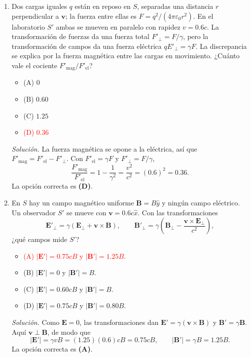 \documentclass[11pt]{article}
\begin{document}
\begin{enumerate}
    \item Dos cargas iguales $q$ están en reposo en $S$, separadas una distancia $r$ perpendicular a $\mathbf{v}$; la fuerza entre ellas es $F=q^2/(4\pi\varepsilon_0r^2)$. En el laboratorio $S'$ ambas se mueven en paralelo con rapidez $v=0.6c$. La transformación de fuerzas da una fuerza total $F'_{\perp}=F/\gamma$, pero la transformación de campos da una fuerza eléctrica $qE'_{\perp}=\gamma F$. La discrepancia se explica por la fuerza magnética entre las cargas en movimiento. ¿Cuánto vale el cociente $F'_{\mathrm{mag}}/F'_{\mathrm{el}}$?
    \begin{itemize}
        \item (A) $0$
        \item (B) $0.60$
        \item (C) $1.25$
        \item \textcolor{red}{(D) $0.36$}
    \end{itemize}
    \textit{Solución.} La fuerza magnética se opone a la eléctrica, así que $F'_{\mathrm{mag}}=F'_{\mathrm{el}}-F'_{\perp}$. Con $F'_{\mathrm{el}}=\gamma F$ y $F'_{\perp}=F/\gamma$,
    \[
        \frac{F'_{\mathrm{mag}}}{F'_{\mathrm{el}}}
        =1-\frac{1}{\gamma^2}=\frac{v^2}{c^2}=(0.6)^2=0.36.
    \]
    La opción correcta es \textbf{(D)}. \parencite{chaparro2026}

    \item En $S$ hay un campo magnético uniforme $\mathbf{B}=B\hat{y}$ y ningún campo eléctrico. Un observador $S'$ se mueve con $\mathbf{v}=0.6c\hat{x}$. Con las transformaciones
    \[
        \mathbf{E}'_{\perp}=\gamma(\mathbf{E}_{\perp}+\mathbf{v}\times\mathbf{B}),
        \qquad
        \mathbf{B}'_{\perp}=\gamma\left(\mathbf{B}_{\perp}-\frac{\mathbf{v}\times\mathbf{E}_{\perp}}{c^2}\right),
    \]
    ¿qué campos mide $S'$?
    \begin{itemize}
        \item \textcolor{red}{(A) $|\mathbf{E}'|=0.75cB$ y $|\mathbf{B}'|=1.25B$.}
        \item (B) $|\mathbf{E}'|=0$ y $|\mathbf{B}'|=B$.
        \item (C) $|\mathbf{E}'|=0.60cB$ y $|\mathbf{B}'|=B$.
        \item (D) $|\mathbf{E}'|=0.75cB$ y $|\mathbf{B}'|=0.80B$.
    \end{itemize}
    \textit{Solución.} Como $\mathbf{E}=0$, las transformaciones dan $\mathbf{E}'=\gamma(\mathbf{v}\times\mathbf{B})$ y $\mathbf{B}'=\gamma\mathbf{B}$. Aquí $\mathbf{v}\perp\mathbf{B}$, de modo que
    \[
        |\mathbf{E}'|=\gamma vB=(1.25)(0.6)cB=0.75cB,
        \qquad |\mathbf{B}'|=\gamma B=1.25B.
    \]
    La opción correcta es \textbf{(A)}. \parencite{chaparro2026}
\end{enumerate}

\printbibliography[title={Referencias}]
\end{document}
